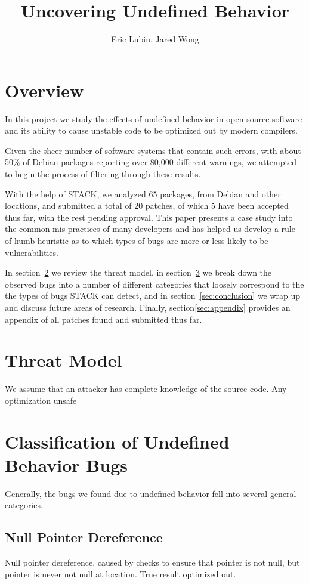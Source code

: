 \documentclass[11pt,twocolumn]{article}
\title{Uncovering Undefined Behavior}
\author{Eric Lubin, Jared Wong}
\newcommand{\NumPackages}{65 }
\newcommand{\NumPatches}{20 }
\newcommand{\NumPatchesAccepted}{5 }
\begin{document}
\maketitle

\section{Overview}
In this project we study the effects of undefined behavior in open source software
and its ability to cause unstable code to be optimized out by modern compilers.

Given the sheer number of software systems that contain such errors, 
with about 50\% of Debian packages reporting over 80,000 different warnings,
we attempted to begin the process of filtering through these results. 

With the help of STACK\cite{stack}, we analyzed \NumPackages packages, 
from Debian and other locations, and submitted a total of \NumPatches patches, 
of which \NumPatchesAccepted have been accepted thus far, with the rest pending approval.
This paper presents a case study into the common mis-practices of many developers and
has helped us develop a rule-of-humb heuristic as to which types of bugs are more
or less likely to be vulnerabilities.

In section~\ref{sec:threat} we review the threat model, in section~\ref{sec:classification}
we break down the observed bugs into a number of different categories that loosely 
correspond to the the types of bugs STACK can detect, and in section~\ref{sec:conclusion}
we wrap up and discuss future areas of research. Finally, section\ref{sec:appendix} provides an 
appendix of all patches found and submitted thus far.

\section{Threat Model}
\label{sec:threat}
We assume that an attacker has complete knowledge of the source code. Any 
optimization unsafe 

\section{Classification of Undefined Behavior Bugs}
\label{sec:classification}
Generally, the bugs we found due to undefined behavior fell into several
general categories.

\subsection{Null Pointer Dereference}
Null pointer dereference, caused by checks to ensure that pointer is not null,
but pointer is never not null at location. True result optimized out.
\end{document}
